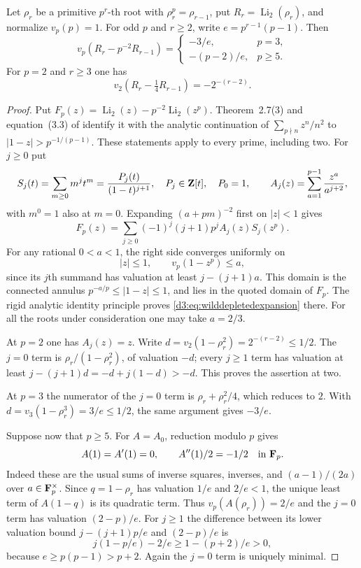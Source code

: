 \begin{lemma}\label{d3:lem:wilddepletion}
Let $\rho_r$ be a primitive $p^r$-th root with
$\rho_r^p=\rho_{r-1}$, put $R_r=\operatorname{Li}_2(\rho_r)$,
and normalize $v_p(p)=1$.
For odd $p$ and $r\geq2$, write $e=p^{r-1}(p-1)$. Then
\[
 v_p(R_r-p^{-2}R_{r-1})=
 \begin{cases}
 -3/e,&p=3,\\
 -(p-2)/e,&p\geq5.
 \end{cases}
\]
For $p=2$ and $r\geq3$ one has
\[
 v_2(R_r-\tfrac14R_{r-1})=-2^{-(r-2)}.
\]
\end{lemma}
\begin{proof}
Put $F_p(z)=\operatorname{Li}_2(z)-p^{-2}\operatorname{Li}_2(z^p)$.
Theorem~2.7(3) and equation~(3.3) of
\cite{BesserDeJeuAlgorithm} identify it with the analytic continuation
of $\sum_{p\nmid n}z^n/n^2$ to $|1-z|>p^{-1/(p-1)}$.
These statements apply to every prime, including two.
For $j\geq0$ put
\[
 S_j(t)=\sum_{m\geq0}m^jt^m=\frac{P_j(t)}{(1-t)^{j+1}},
 \quad P_j\in\mathbf Z[t],\quad P_0=1,
 \qquad
 A_j(z)=\sum_{a=1}^{p-1}\frac{z^a}{a^{j+2}},
\]
with $m^0=1$ also at $m=0$.
Expanding $(a+pm)^{-2}$ first on $|z|<1$ gives
\begin{equation}\label{d3:eq:wilddepletedexpansion}
 F_p(z)=\sum_{j\geq0}(-1)^j(j+1)p^j A_j(z)S_j(z^p).
\end{equation}
For any rational $0<a<1$, the right side converges uniformly on
\[
 |z|\leq1,\qquad v_p(1-z^p)\leq a,
\]
since its $j$th summand has valuation at least $j-(j+1)a$.
This domain is the connected annulus
$p^{-a/p}\leq|1-z|\leq1$, and lies in the quoted domain of $F_p$.
The rigid analytic identity principle proves
\eqref{d3:eq:wilddepletedexpansion} there. For all the roots under
consideration one may take $a=2/3$.

At $p=2$ one has $A_j(z)=z$. Write
$d=v_2(1-\rho_r^2)=2^{-(r-2)}\leq1/2$.
The $j=0$ term is $\rho_r/(1-\rho_r^2)$, of valuation $-d$;
every $j\geq1$ term has valuation at least
$j-(j+1)d=-d+j(1-d)>-d$. This proves the assertion at two.

At $p=3$ the numerator of the $j=0$ term is
$\rho_r+\rho_r^2/4$, which reduces to $2$.
With $d=v_3(1-\rho_r^3)=3/e\leq1/2$, the same argument gives $-3/e$.

Suppose now that $p\geq5$. For $A=A_0$, reduction modulo $p$ gives
\[
 A(1)=A'(1)=0,\qquad A''(1)/2=-1/2\quad\text{in }\mathbf F_p.
\]
Indeed these are the usual sums of inverse squares, inverses,
and $(a-1)/(2a)$ over $a\in\mathbf F_p^\times$.
Since $q=1-\rho_r$ has valuation $1/e$ and $2/e<1$,
the unique least term of $A(1-q)$ is its quadratic term.
Thus $v_p(A(\rho_r))=2/e$ and the $j=0$ term has valuation $(2-p)/e$.
For $j\geq1$ the difference between its lower valuation bound
$j-(j+1)p/e$ and $(2-p)/e$ is
\[
 j(1-p/e)-2/e\geq1-(p+2)/e>0,
\]
because $e\geq p(p-1)>p+2$.
Again the $j=0$ term is uniquely minimal.
\end{proof}

